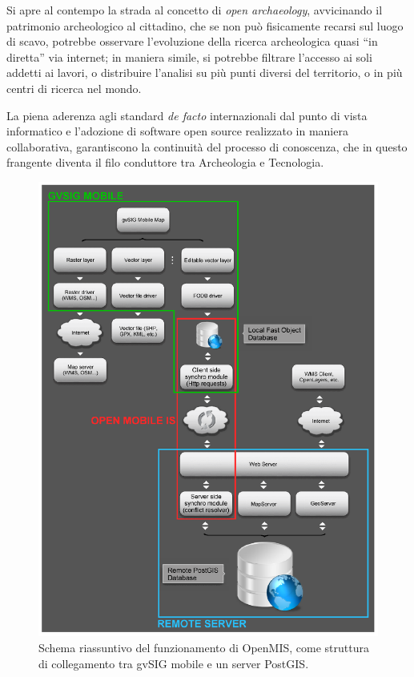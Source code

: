 	Si apre al contempo la strada al concetto di \emph{open archaeology}, avvicinando il patrimonio archeologico al cittadino, che se non può fisicamente recarsi sul luogo di scavo, potrebbe osservare l'evoluzione della ricerca archeologica quasi ``in diretta'' via internet; in maniera simile, si potrebbe filtrare l'accesso ai soli addetti ai lavori, o distribuire l'analisi su più punti diversi del territorio, o in più centri di ricerca nel mondo.

	La piena aderenza agli standard \emph{de facto} internazionali dal punto di vista informatico e l'adozione di software open source realizzato in maniera collaborativa, garantiscono la continuità del processo di conoscenza, che in questo frangente diventa il filo conduttore tra Archeologia e Tecnologia.

	\begin{center}
		\begin{figure}
			\centering
			\includegraphics[scale=0.5]{img/tellus/general_scheme}
			\caption{{\small \label{fig:Schema-riassuntivo}Schema riassuntivo del funzionamento di OpenMIS, come struttura di collegamento tra gvSIG mobile e un server PostGIS.}}
		\end{figure}
	\end{center}

